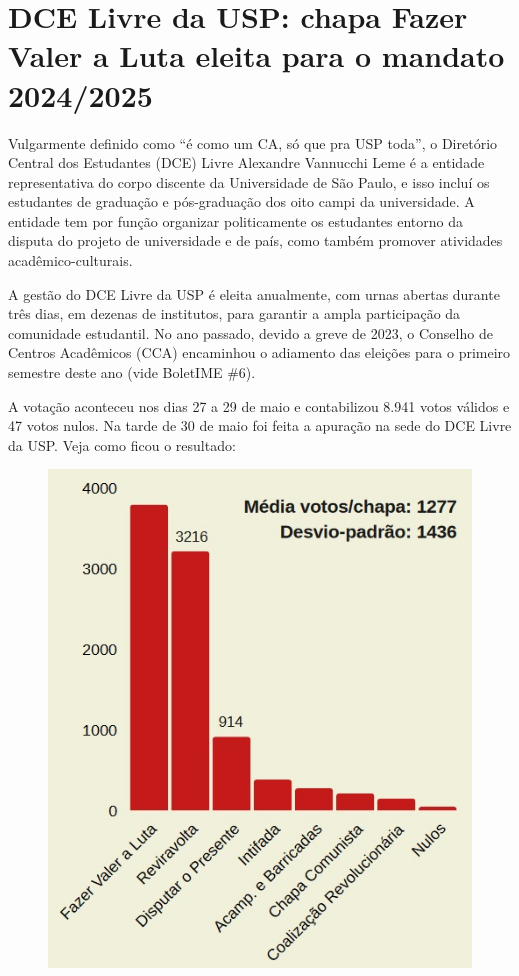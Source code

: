 \section*{DCE Livre da USP: chapa Fazer Valer a Luta eleita para o mandato 2024/2025}

Vulgarmente definido como “é como um CA, só que pra USP toda”, o Diretório Central dos Estudantes (DCE) Livre Alexandre Vannucchi Leme é a entidade representativa do corpo discente da Universidade de São Paulo, e isso incluí os estudantes de graduação e pós-graduação dos oito campi da universidade. A entidade tem por função organizar politicamente os estudantes entorno da disputa do projeto de universidade e de país, como também promover atividades acadêmico-culturais.

A gestão do DCE Livre da USP é eleita anualmente, com urnas abertas durante três dias, em dezenas de institutos, para garantir a ampla participação da comunidade estudantil. No ano passado, devido a greve de 2023, o Conselho de Centros Acadêmicos (CCA) encaminhou o adiamento das eleições para o primeiro semestre deste ano (vide BoletIME \#6).

A votação aconteceu nos dias 27 a 29 de maio e contabilizou 8.941 votos válidos e 47 votos nulos. Na tarde de 30 de maio foi feita a apuração na sede do DCE Livre da USP. Veja como ficou o resultado: 

\begin{figure}[H]
    \centering
    \includegraphics[width=\columnwidth]{textos//img/resultado_geral.jpg}
\end{figure}

